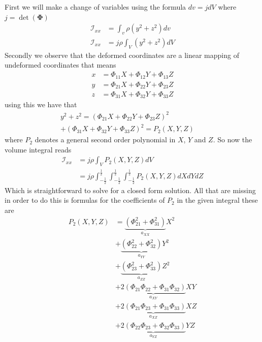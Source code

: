 \documentclass[twocolumn]{article}
\newcommand{\mat}[1]{\ensuremath{\mathbf{#1} }}
\newcommand{\inertia}{\ensuremath{\mathcal{I} }}
\begin{document}
First we will make a change of variables using the formula $dv = j dV$ where $j
= \det(\mat  \Phi)$
\begin{subequations}
  \begin{align*}
    \inertia_{xx} &= \int_v  \rho \left( y^2 + z^2 \right)  dv \\
    \inertia_{xx} &= j \rho \int_V   \left( y^2 + z^2 \right)  dV
  \end{align*}
\end{subequations}
Secondly we observe that the deformed coordinates are a linear mapping of
undeformed coordinates that means
\begin{subequations}
  \begin{align*}
    x  &=  \Phi_{11} X + \Phi_{12} Y + \Phi_{13} Z\\
    y  &=  \Phi_{21} X + \Phi_{22} Y + \Phi_{23} Z\\
    z  &=  \Phi_{31} X + \Phi_{32} Y + \Phi_{33} Z
  \end{align*}
\end{subequations}
using this we have that
\begin{equation*}
  \begin{split}
    y^2 + z^2
    =
    \left(\Phi_{21} X + \Phi_{22} Y + \Phi_{23} Z\right)^2
    \quad \quad \quad \quad \quad
    \\
    +
    \left(\Phi_{31} X + \Phi_{32} Y    + \Phi_{33} Z\right)^2
    =
    P_2(X,Y,Z)
  \end{split}
\end{equation*}
where $P_2$ denotes a general second order polynomial in $X$, $Y$ and $Z$. So
now the volume integral reads
\begin{subequations}
  \begin{align*}
    \inertia_{xx}
    &=
    j \rho \int_V   P_2(X,Y,Z)  dV\\
    &=
    j \rho
    \int_{-\frac{1}{2}}^{\frac{1}{2}}
    \int_{-\frac{1}{2}}^{\frac{1}{2}}
    \int_{-\frac{1}{2}}^{\frac{1}{2}}
    P_2(X,Y,Z)
    dX
    dY
    dZ
  \end{align*}
\end{subequations}
Which is straightforward to solve for a closed form solution. All that are
missing in order to do this is formulas for the coefficients of $P_2$ in the
given integral these are
\begin{subequations}
  \begin{align*}
    P_2(X,Y,Z)
    &= \underbrace{ \left (\Phi_{21}^2 + \Phi_{31}^2\right) }_{a_{XX}} X^2 \\
    &+ \underbrace{ \left (\Phi_{22}^2 + \Phi_{32}^2\right) }_{a_{YY}}  Y^2 \\
    &+ \underbrace{ \left (\Phi_{23}^2 + \Phi_{33}^2\right) }_{a_{ZZ}}  Z^2\\
    &+ \underbrace{ 2 \left ( \Phi_{21} \Phi_{22} + \Phi_{31} \Phi_{32} \right)
    }_{a_{XY}}  X Y \\
    &+ \underbrace{ 2 \left ( \Phi_{21} \Phi_{23} + \Phi_{31} \Phi_{33} \right)
    }_{a_{XZ}}  X Z \\
    &+ \underbrace{ 2 \left(\Phi_{22} \Phi_{23} + \Phi_{32} \Phi_{33}\right) }_{a_{YZ}} Y Z
  \end{align*}
\end{subequations}
\end{document}
